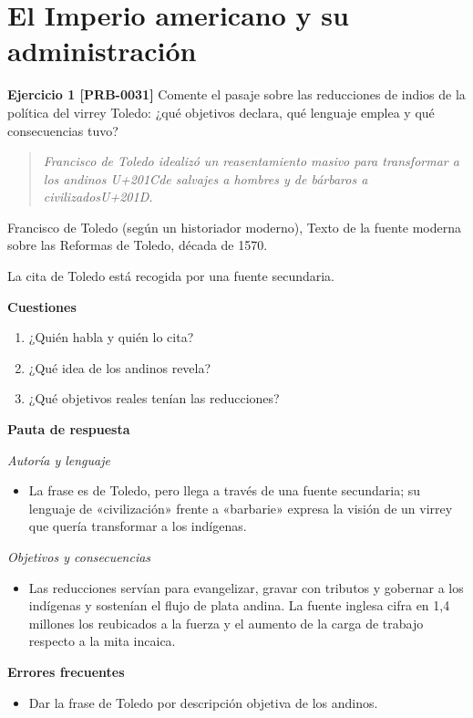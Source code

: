\documentclass{book}
\begin{document}
\section{El Imperio americano y su administración}

\noindent\textbf{Ejercicio 1 [PRB-0031]}
Comente el pasaje sobre las reducciones de indios de la política del virrey Toledo: ¿qué objetivos declara, qué lenguaje emplea y qué consecuencias tuvo?


\begin{quote}
\itshape Francisco de Toledo idealizó un reasentamiento masivo para transformar a los andinos {U+201C}de salvajes a hombres y de bárbaros a civilizados{U+201D}.
\end{quote}
{\noindent\footnotesize Francisco de Toledo (según un historiador moderno), Texto de la fuente moderna sobre las Reformas de Toledo, década de 1570.\par}
{\noindent\footnotesize La cita de Toledo está recogida por una fuente secundaria.\par}

\noindent\textbf{Cuestiones}
\begin{enumerate}
\item ¿Quién habla y quién lo cita?
\item ¿Qué idea de los andinos revela?
\item ¿Qué objetivos reales tenían las reducciones?
\end{enumerate}

\noindent\textbf{Pauta de respuesta}

\noindent\textit{Autoría y lenguaje}
\begin{itemize}
\item La frase es de Toledo, pero llega a través de una fuente secundaria; su lenguaje de «civilización» frente a «barbarie» expresa la visión de un virrey que quería transformar a los indígenas.
\end{itemize}

\noindent\textit{Objetivos y consecuencias}
\begin{itemize}
\item Las reducciones servían para evangelizar, gravar con tributos y gobernar a los indígenas y sostenían el flujo de plata andina. La fuente inglesa cifra en 1,4 millones los reubicados a la fuerza y el aumento de la carga de trabajo respecto a la mita incaica.
\end{itemize}

\noindent\textbf{Errores frecuentes}
\begin{itemize}
\item Dar la frase de Toledo por descripción objetiva de los andinos.
\end{itemize}
\end{document}
